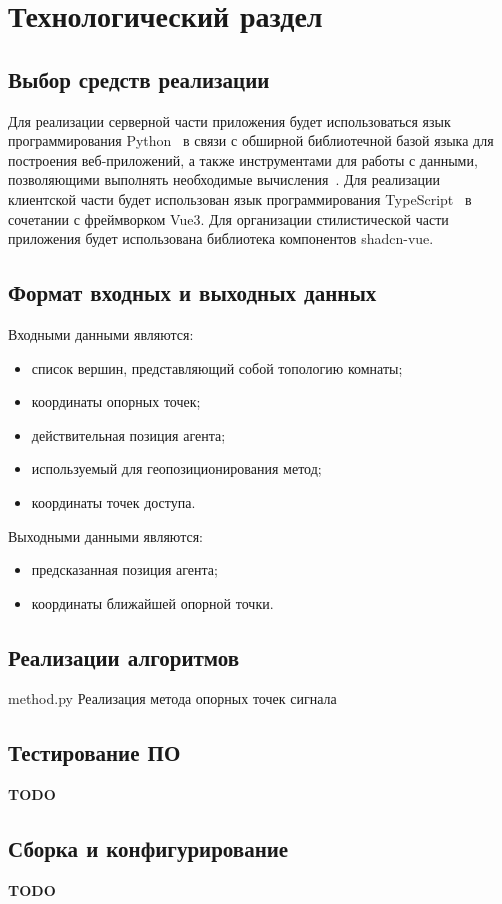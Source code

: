 \chapter{Технологический раздел}

\section{Выбор средств реализации}

Для реализации серверной части приложения будет использоваться язык программирования Python~\cite{python} в связи с обширной библиотечной базой языка для построения веб-приложений, а также инструментами для работы с данными, позволяющими выполнять необходимые вычисления~\cite{pyproblems}. Для реализации клиентской части будет использован язык программирования TypeScript~\cite{typescript} в сочетании с фреймворком Vue3. Для организации стилистической части приложения будет использована библиотека компонентов shadcn-vue.

\section{Формат входных и выходных данных}

Входными данными являются:

\begin{itemize}[label=---]
    \item список вершин, представляющий собой топологию комнаты;
    \item координаты опорных точек;
    \item действительная позиция агента;
    \item используемый для геопозиционирования метод;
    \item координаты точек доступа.
\end{itemize}

Выходными данными являются:

\begin{itemize}[label=---]
    \item предсказанная позиция агента;
    \item координаты ближайшей опорной точки.
\end{itemize}

\clearpage

\section{Реализации алгоритмов}

    {method.py}
    {Реализация метода опорных точек сигнала}

\section{Тестирование ПО}

\textbf{TODO}

\section{Сборка и конфигурирование}

\textbf{TODO}
